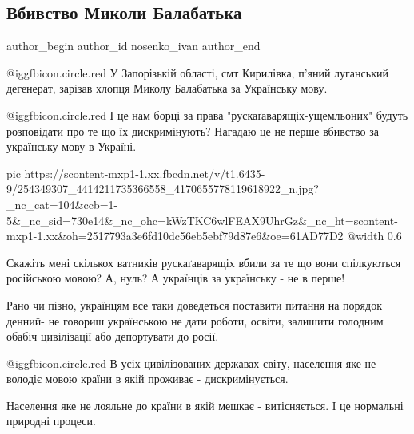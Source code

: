  
 
 
 
 
 
\subsection{Вбивство Миколи Балабатька}
\label{sec:07_11_2021.fb.nosenko_ivan.1.balabatjko}
 
\ifcmt
 author_begin
   author_id nosenko_ivan
 author_end
\fi

 @igg{fbicon.circle.red}  У Запорізькій області, смт Кирилівка, п'яний луганський дегенерат, зарізав
хлопця Миколу Балабатька за Українську мову.

 @igg{fbicon.circle.red}  І це нам борці за права "рускаґаварящіх-ущемльоних" будуть розповідати про
те що їх дискримінують? Нагадаю це не перше вбивство за українську мову в
Україні.

\ifcmt
  pic https://scontent-mxp1-1.xx.fbcdn.net/v/t1.6435-9/254349307_4414211735366558_4170655778119618922_n.jpg?_nc_cat=104&ccb=1-5&_nc_sid=730e14&_nc_ohc=kWzTKC6wlFEAX9UhrGz&_nc_ht=scontent-mxp1-1.xx&oh=2517793a3e6fd10dc56eb5ebf79d87e6&oe=61AD77D2
  @width 0.6
\fi

Скажіть мені скількох ватників рускаґаварящіх вбили за те що вони спілкуються
російською мовою? А, нуль? А українців за українську - не в перше!

Рано чи пізно, українцям все таки доведеться поставити питання на порядок
денний- не говориш українською не дати роботи, освіти, залишити голодним обабіч
цивілізації або депортувати до росії.

 @igg{fbicon.circle.red}  В усіх цивілізованих державах світу, населення яке не володіє мовою країни в
якій проживає - дискримінується. 

Населення яке не лояльне до країни в якій мешкає - витісняється. І це нормальні
природні процеси.

